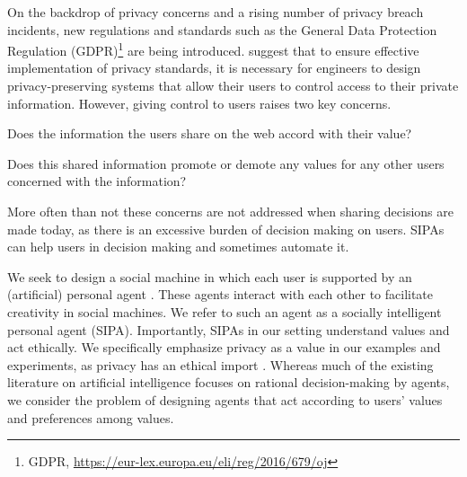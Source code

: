 On the backdrop of privacy concerns and a rising number of privacy breach incidents, new regulations and standards such as the General Data Protection Regulation (GDPR)\footnote{GDPR, \url{https://eur-lex.europa.eu/eli/reg/2016/679/oj}} are being introduced. 
\citet{spiekermann2009enggprivacy} suggest that to ensure effective implementation of privacy standards, it is necessary for engineers to design privacy-preserving systems that allow their users to control access to their private information. 
However, giving control to users raises two key concerns. 
\begin{enuminline} 
\item Does the information the users share on the web accord with their value? 
\item Does this shared information promote or demote any values for any other users concerned with the information? 
\end{enuminline}
More often than not these concerns are not addressed when sharing decisions are made today, as there is an excessive burden of decision making on users. SIPAs can help users in decision making and sometimes automate it. 

We seek to design a social machine in which each user is supported by an (artificial) personal agent \citep{Murukannaiah-AAMAS14-Xipho}. These agents interact with each other to facilitate creativity in social machines. We refer to such an agent as a socially intelligent personal agent (SIPA). Importantly, SIPAs in our setting understand values and act ethically. We specifically emphasize privacy as a value in our examples and experiments, as privacy has an ethical import \citep{Friedman-2008-value-sensitive-design}. Whereas much of the existing literature on artificial intelligence focuses on rational decision-making by agents, we consider the problem of designing agents that act according to users' values and preferences among values.


